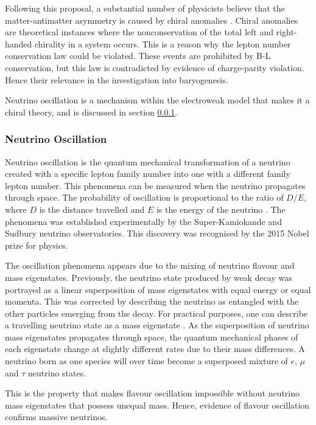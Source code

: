 \documentclass[10pt]{article}
\begin{document}
Following this proposal, a substantial number of physicists believe that the matter-antimatter asymmetry is caused by chiral anomalies \cite{Dolgov_1998}. Chiral anomalies are theoretical instances where the nonconservation of the total left and right-handed chirality in a system occurs. This is a reason why the lepton number conservation law could be violated. These events are prohibited by B-L conservation, but this law is contradicted by evidence of charge-parity violation.  Hence their relevance in the investigation into baryogenesis.

Neutrino oscillation is a mechanism within the electroweak model that makes it a chiral theory, and is discussed in section \ref{oscillation}.

\subsubsection{Neutrino Oscillation} \label{oscillation}

Neutrino oscillation is the quantum mechanical transformation of a neutrino created with a specific lepton family number into one with a different family lepton number. This phenomena can be measured when the neutrino propagates through space. The probability of oscillation is proportional to the ratio of $D/E$, where $D$ is the distance travelled and $E$ is the energy of the neutrino \cite{rodejohann2007neutrino}. The phenomena was established experimentally by the Super-Kamiokande and Sudbury neutrino observatories. This discovery was recognised by the 2015 Nobel prize for physics.

The oscillation phenomena appears due to the mixing of neutrino flavour and mass eigenstates. Previously, the neutrino state produced by weak decay was portrayed as a linear superposition of mass eigenstates with equal energy or equal momenta. This was corrected by describing the neutrino as entangled with the other particles emerging from the decay. For practical purposes, one can describe a travelling neutrino state as a mass eigenstate \cite{Cohen_2009}. As the superposition of neutrino mass eigenstates propagates through space, the quantum mechanical phases of each eigenstate change at slightly different rates due to their mass differences. A neutrino born as one species will over time become a superposed mixture of $e$, $\mu$ and $\tau$ neutrino states. 

This is the property that makes flavour oscillation impossible without neutrino mass eigenstates that possess unequal mass. Hence, evidence of flavour oscillation confirms massive neutrinos.
\end{document}
